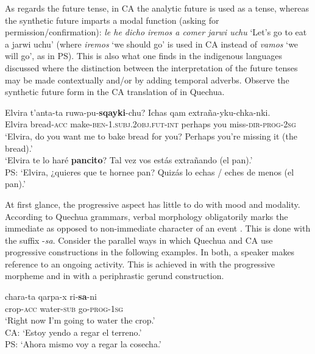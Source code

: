 \documentclass[output=paper,hidelinks]{langscibook}
\begin{document}
As regards the future tense, in CA the analytic future is used as a tense, where\-as the synthetic future imparts a modal function (asking for permission/confirma\-tion): \textit{le he dicho iremos a comer jarwi uchu} ‘Let’s go to eat a jarwi uchu’ (where \textit{iremos} `we should go' is used in CA instead of \textit{vamos} `we will go', as in PS). This is also what one finds in the indigenous languages discussed where the distinction between the interpretation of the future tenses may be made contextually and/or by adding temporal adverbs. Observe the synthetic future form in the CA translation of  in Quechua.

\ea \label{ex:Elivra}
\gll Elvira t’anta-ta ruwa-pu-\textbf{sqayki}-chu? Ichas qam extraña-yku-chka-nki. \\
Elvira bread-\textsc{acc} make-\textsc{ben-1.subj.2obj.fut-int} perhaps you miss-\textsc{dir-prog-2sg} \\ \glt `Elvira, do you want me to bake bread for you? Perhaps you're missing it (the bread).' \\
`Elvira te lo haré \textbf{pancito}? Tal vez vos estás extrañando (el pan).' \citep[204]{RN16}\\
PS: `Elvira, ¿quieres que te hornee pan? Quizás lo echas / eches de menos (el pan).'
\z

At first glance, the progressive aspect has little to do with mood and modality. According to Quechua grammars, verbal morphology obligatorily marks the immediate as opposed to non-immediate character of an event \citep[231]{adelaar2004, RN48, cerron2008quechumara, RN50}. This is done with the suffix -\textit{sa}. %
Consider the parallel ways in which Quechua and CA use progressive constructions in the following examples. In both, a speaker makes reference to an ongoing activity. This is achieved in  with the progressive morpheme and in  with a periphrastic gerund construction.

\ea \label{ex:water}
\gll chara-ta qarpa-x ri-\textbf{sa}-ni \\
crop-\textsc{acc} water-\textsc{sub} go-\textsc{prog-1sg} \\ 
\glt ‘Right now I'm going to water the crop.’ \citep[267]{RN14}\\
CA: `Estoy yendo a regar el terreno.' \\
PS: `Ahora mismo voy a regar la cosecha.'
\z
\end{document}
